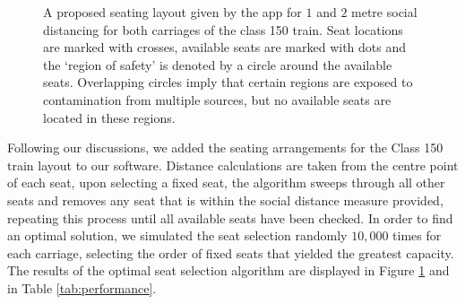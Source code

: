 \documentclass[11pt,a4paper]{article}
\begin{document}
\begin{figure}[ht!]
\caption{A proposed seating layout given by the app for $1$ and $2$ metre social distancing for both carriages of the class 150 train. Seat locations are marked with crosses, available seats are marked with dots and the `region of safety' is denoted by a circle around the available seats. Overlapping circles imply that certain regions are exposed to contamination from multiple sources, but no available seats are located in these regions. }
\label{Demonstration_pics}
\end{figure}


Following our discussions, we added the seating arrangements for the Class 150 train layout to our software. Distance calculations are taken from the centre point of each seat, upon selecting a fixed seat, the algorithm sweeps through all other seats and removes any seat that is within the social distance measure provided, repeating this process until all available seats have been checked. In order to find an optimal solution, we simulated the seat selection randomly $10,000$ times for each carriage, selecting the order of fixed seats that yielded the greatest capacity. The results of the optimal seat selection algorithm are displayed in Figure \ref{Demonstration_pics} and in Table \ref{tab:performance}.
\end{document}
